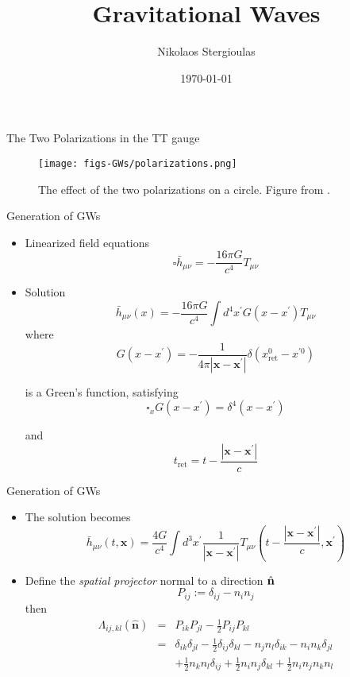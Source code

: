 \documentclass[size=11pt,style=paintings]{powerdot}
\begin{document}
\title{Gravitational Waves}
\author{Nikolaos Stergioulas}
\date{\today}
\maketitle

\begin{slide}{The Two Polarizations in the TT gauge}
\begin{figure}
  \centering
  \texttt{[image: figs-GWs/polarizations.png]}
  \caption{The effect of the two polarizations on a circle. Figure from \cite{2008-Maggiore}.}
\label{fig:polarization}
\end{figure}
\end{slide}

\begin{slide}{Generation of GWs}

  \begin{itemize}
    \item Linearized field equations
 $$
\square \bar{h}_{\mu \nu}=-\frac{16 \pi G}{c^{4}} T_{\mu \nu}
$$
 \item Solution
$$
\bar{h}_{\mu \nu}(x)=-\frac{16 \pi G}{c^{4}} \int d^{4} x^{\prime} G\left(x-x^{\prime}\right) T_{\mu \nu}
$$
where  $$
\boxed{G\left(x-x^{\prime}\right)=-\frac{1}{4 \pi\left|\mathbf{x}-\mathbf{x}^{\prime}\right|} \delta\left(x_{\mathrm{ret}}^{0}-x^{\prime 0}\right)}
$$

 is a Green's function, satisfying
   $$
\square_{x} G\left(x-x^{\prime}\right)=\delta^{4}\left(x-x^{\prime}\right)
$$
  
 and $$
t_{\mathrm{ret}}=t-\frac{\left|\mathbf{x}-\mathbf{x}^{\prime}\right|}{c}
$$
\end{itemize}
\end{slide}

\begin{slide}{Generation of GWs}
 \begin{itemize}
 \item The solution becomes
 $$
\boxed{\bar{h}_{\mu \nu}(t, \mathbf{x})=\frac{4 G}{c^{4}} \int d^{3} x^{\prime} \frac{1}{\left|\mathbf{x}-\mathbf{x}^{\prime}\right|} T_{\mu \nu}\left(t-\frac{\left|\mathbf{x}-\mathbf{x}^{\prime}\right|}{c}, \mathbf{x}^{\prime}\right)}
$$
\item Define the \textit{spatial projector} normal to a direction $\hat {\bf n}$
$$
P_{i j} := \delta_{i j}-n_{i} n_{j}
$$
 then 
\begin{eqnarray}
\Lambda_{i j, k l}(\hat{\mathbf{n}}) &=&P_{i k} P_{j l}-\frac{1}{2} P_{ij}P_{kl}\nonumber\\
&=&\delta_{i k} \delta_{j l}-\frac{1}{2} \delta_{i j} \delta_{k l}-n_{j} n_{l} \delta_{i k}-n_{i} n_{k} \delta_{j l} \nonumber\\ 
&&+\frac{1}{2} n_{k} n_{l} \delta_{i j}+\frac{1}{2} n_{i} n_{j} \delta_{kl}
+\frac{1}{2} n_{i} n_{j} n_{k} n_{l}\nonumber
 \end{eqnarray}
\end{itemize}
 \end{slide}
\end{document}
